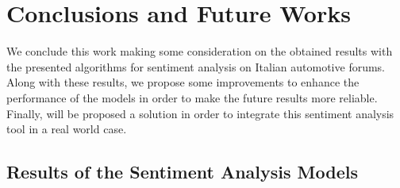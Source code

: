 \chapter{Conclusions and Future Works}
\label{conclusion}

We conclude this work making some consideration on the obtained results with the presented algorithms for sentiment analysis on Italian automotive forums. Along with these results, we propose some improvements to enhance the performance of the models in order to make the future results more reliable. Finally, will be proposed a solution in order to integrate this sentiment analysis tool in a real world case.

\section{Results of the Sentiment Analysis Models}

